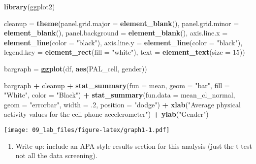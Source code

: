 \documentclass[
]{article}
\newenvironment{Shaded}{\begin{snugshade}}{\end{snugshade}}
\newcommand{\DataTypeTok}[1]{\textcolor[rgb]{0.13,0.29,0.53}{#1}}
\newcommand{\DecValTok}[1]{\textcolor[rgb]{0.00,0.00,0.81}{#1}}
\newcommand{\FloatTok}[1]{\textcolor[rgb]{0.00,0.00,0.81}{#1}}
\newcommand{\KeywordTok}[1]{\textcolor[rgb]{0.13,0.29,0.53}{\textbf{#1}}}
\newcommand{\NormalTok}[1]{#1}
\newcommand{\OperatorTok}[1]{\textcolor[rgb]{0.81,0.36,0.00}{\textbf{#1}}}
\newcommand{\StringTok}[1]{\textcolor[rgb]{0.31,0.60,0.02}{#1}}
\providecommand{\tightlist}{%
  \setlength{\itemsep}{0pt}\setlength{\parskip}{0pt}}
\begin{document}
\begin{Shaded}
\begin{Highlighting}[]
\KeywordTok{library}\NormalTok{(ggplot2)}

\NormalTok{cleanup =}\StringTok{ }\KeywordTok{theme}\NormalTok{(}\DataTypeTok{panel.grid.major =} \KeywordTok{element_blank}\NormalTok{(), }
                \DataTypeTok{panel.grid.minor =} \KeywordTok{element_blank}\NormalTok{(), }
                \DataTypeTok{panel.background =} \KeywordTok{element_blank}\NormalTok{(), }
                \DataTypeTok{axis.line.x =} \KeywordTok{element_line}\NormalTok{(}\DataTypeTok{color =} \StringTok{"black"}\NormalTok{),}
                \DataTypeTok{axis.line.y =} \KeywordTok{element_line}\NormalTok{(}\DataTypeTok{color =} \StringTok{"black"}\NormalTok{),}
                \DataTypeTok{legend.key =} \KeywordTok{element_rect}\NormalTok{(}\DataTypeTok{fill =} \StringTok{"white"}\NormalTok{),}
                \DataTypeTok{text =} \KeywordTok{element_text}\NormalTok{(}\DataTypeTok{size =} \DecValTok{15}\NormalTok{))}

\NormalTok{bargraph =}\StringTok{ }\KeywordTok{ggplot}\NormalTok{(df, }\KeywordTok{aes}\NormalTok{(PAL_cell, gender))}

\NormalTok{bargraph }\OperatorTok{+}
\StringTok{  }\NormalTok{cleanup }\OperatorTok{+}
\StringTok{  }\KeywordTok{stat_summary}\NormalTok{(}\DataTypeTok{fun =}\NormalTok{ mean, }
               \DataTypeTok{geom =} \StringTok{"bar"}\NormalTok{, }
               \DataTypeTok{fill =} \StringTok{"White"}\NormalTok{, }
               \DataTypeTok{color =} \StringTok{"Black"}\NormalTok{) }\OperatorTok{+}
\StringTok{  }\KeywordTok{stat_summary}\NormalTok{(}\DataTypeTok{fun.data =}\NormalTok{ mean_cl_normal, }
               \DataTypeTok{geom =} \StringTok{"errorbar"}\NormalTok{, }
               \DataTypeTok{width =} \FloatTok{.2}\NormalTok{, }
               \DataTypeTok{position =} \StringTok{"dodge"}\NormalTok{) }\OperatorTok{+}
\StringTok{  }\KeywordTok{xlab}\NormalTok{(}\StringTok{"Average physical activity values for the cell phone accelerometer"}\NormalTok{) }\OperatorTok{+}
\StringTok{  }\KeywordTok{ylab}\NormalTok{(}\StringTok{"Gender"}\NormalTok{)}
\end{Highlighting}
\end{Shaded}

\texttt{[image: 09\_lab\_files/figure-latex/graph1-1.pdf]}

\begin{enumerate}
\def\labelenumi{\arabic{enumi})}
\setcounter{enumi}{4}
\tightlist
\item
  Write up: include an APA style results section for this analysis (just
  the t-test not all the data screening).
\end{enumerate}
\end{document}
